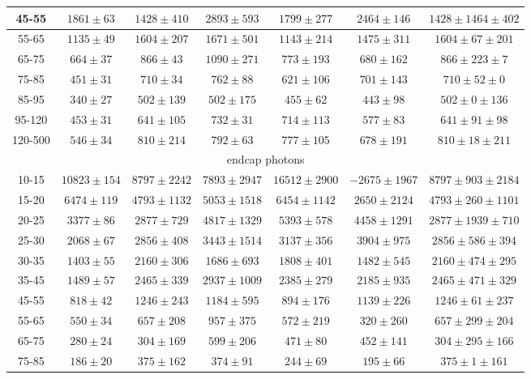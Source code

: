 \begin{table}[h]
\begin{center}
\begin{tabular}{|c|c|c|c|c|c|c|}
    45-55 & $1861\pm63$ & $1428\pm410$ & $2893\pm593$ & $1799\pm277$ & $2464\pm146$ &$1428\pm1464\pm402$  \\ \hline
    55-65 & $1135\pm49$ & $1604\pm207$ & $1671\pm501$ & $1143\pm214$ & $1475\pm311$ &$1604\pm67\pm201$  \\ \hline
    65-75 & $664\pm37$ & $866\pm43$ & $1090\pm271$ & $773\pm193$ & $680\pm162$ &$866\pm223\pm7$  \\ \hline
    75-85 & $451\pm31$ & $710\pm34$ & $762\pm88$ & $621\pm106$ & $701\pm143$ &$710\pm52\pm0$  \\ \hline
    85-95 & $340\pm27$ & $502\pm139$ & $502\pm175$ & $455\pm62$ & $443\pm98$ &$502\pm0\pm136$  \\ \hline
    95-120 & $453\pm31$ & $641\pm105$ & $732\pm31$ & $714\pm113$ & $577\pm83$ &$641\pm91\pm98$  \\ \hline
    120-500 & $546\pm34$ & $810\pm214$ & $792\pm63$ & $777\pm105$ & $678\pm191$ &$810\pm18\pm211$  \\ \hline
    \multicolumn{7}{|c|}{endcap photons} \\ \hline
    10-15 & $10823\pm154$ & $8797\pm2242$ & $7893\pm2947$ & $16512\pm2900$ & $-2675\pm1967$ &$8797\pm903\pm2184$  \\ \hline
    15-20 & $6474\pm119$ & $4793\pm1132$ & $5053\pm1518$ & $6454\pm1142$ & $2650\pm2124$ &$4793\pm260\pm1101$  \\ \hline
    20-25 & $3377\pm86$ & $2877\pm729$ & $4817\pm1329$ & $5393\pm578$ & $4458\pm1291$ &$2877\pm1939\pm710$  \\ \hline
    25-30 & $2068\pm67$ & $2856\pm408$ & $3443\pm1514$ & $3137\pm356$ & $3904\pm975$ &$2856\pm586\pm394$  \\ \hline
    30-35 & $1403\pm55$ & $2160\pm306$ & $1686\pm693$ & $1808\pm401$ & $1482\pm545$ &$2160\pm474\pm295$  \\ \hline
    35-45 & $1489\pm57$ & $2465\pm339$ & $2937\pm1009$ & $2385\pm279$ & $2185\pm935$ &$2465\pm471\pm329$  \\ \hline
    45-55 & $818\pm42$ & $1246\pm243$ & $1184\pm595$ & $894\pm176$ & $1139\pm226$ &$1246\pm61\pm237$  \\ \hline
    55-65 & $550\pm34$ & $657\pm208$ & $957\pm375$ & $572\pm219$ & $320\pm260$ &$657\pm299\pm204$  \\ \hline
    65-75 & $280\pm24$ & $304\pm169$ & $599\pm206$ & $471\pm80$ & $452\pm141$ &$304\pm295\pm166$  \\ \hline
    75-85 & $186\pm20$ & $375\pm162$ & $374\pm91$ & $244\pm69$ & $195\pm66$ &$375\pm1\pm161$  \\ \hline

\end{tabular}
\end{center}
\end{table}
